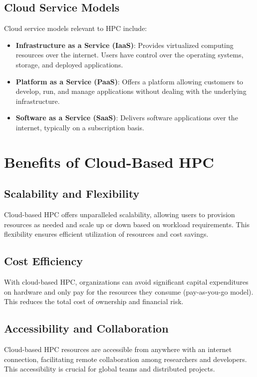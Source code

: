 \subsection{Cloud Service Models}

Cloud service models relevant to HPC include:

\begin{itemize}
    \item \textbf{Infrastructure as a Service (IaaS)}: Provides virtualized computing resources over the internet. Users have control over the operating systems, storage, and deployed applications.
    \item \textbf{Platform as a Service (PaaS)}: Offers a platform allowing customers to develop, run, and manage applications without dealing with the underlying infrastructure.
    \item \textbf{Software as a Service (SaaS)}: Delivers software applications over the internet, typically on a subscription basis.
\end{itemize}

\section{Benefits of Cloud-Based HPC}

\subsection{Scalability and Flexibility}

Cloud-based HPC offers unparalleled scalability, allowing users to provision resources as needed and scale up or down based on workload requirements. This flexibility ensures efficient utilization of resources and cost savings.

\subsection{Cost Efficiency}

With cloud-based HPC, organizations can avoid significant capital expenditures on hardware and only pay for the resources they consume (pay-as-you-go model). This reduces the total cost of ownership and financial risk.

\subsection{Accessibility and Collaboration}

Cloud-based HPC resources are accessible from anywhere with an internet connection, facilitating remote collaboration among researchers and developers. This accessibility is crucial for global teams and distributed projects.


